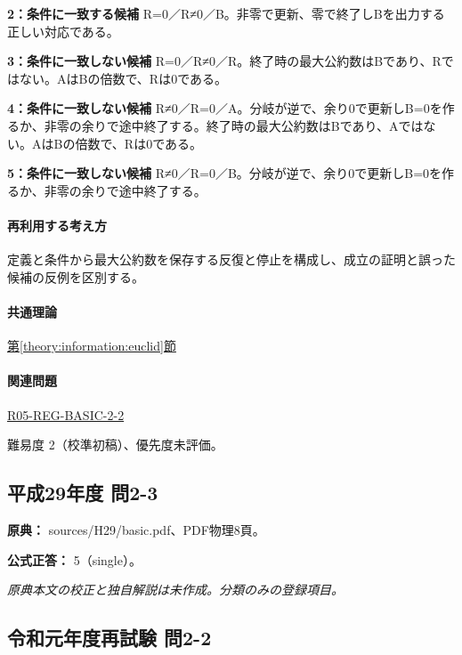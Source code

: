 \noindent\textbf{2：条件に一致する候補} R=\allowbreak{}0／R≠0／B。非零で更新、零で終了しBを出力する正しい対応である。\par

\noindent\textbf{3：条件に一致しない候補} R=\allowbreak{}0／R≠0／R。終了時の最大公約数はBであり、Rではない。AはBの倍数で、Rは0である。\par

\noindent\textbf{4：条件に一致しない候補} R≠0／R=\allowbreak{}0／A。分岐が逆で、余り0で更新しB=\allowbreak{}0を作るか、非零の余りで途中終了する。終了時の最大公約数はBであり、Aではない。AはBの倍数で、Rは0である。\par

\noindent\textbf{5：条件に一致しない候補} R≠0／R=\allowbreak{}0／B。分岐が逆で、余り0で更新しB=\allowbreak{}0を作るか、非零の余りで途中終了する。\par

\paragraph{再利用する考え方} 定義と条件から最大公約数を保存する反復と停止を構成し、成立の証明と誤った候補の反例を区別する。

\paragraph{共通理論} \hyperref[theory:information:euclid]{第\ref*{theory:information:euclid}節}

\paragraph{関連問題} \hyperref[q:r05-reg-basic-2-2]{R05-REG-BASIC-2-2}

\par 難易度 2（校準初稿）、優先度未評価。

\subsection{平成29年度 問2-3}
\label{q:h29-reg-basic-2-3}

\noindent\textbf{原典：} sources/H29/basic.pdf、PDF物理8頁。

\textbf{公式正答：} 5（single）。

\par\textit{原典本文の校正と独自解説は未作成。分類のみの登録項目。}

\subsection{令和元年度再試験 問2-2}
\label{q:r01-ret-basic-2-2}


